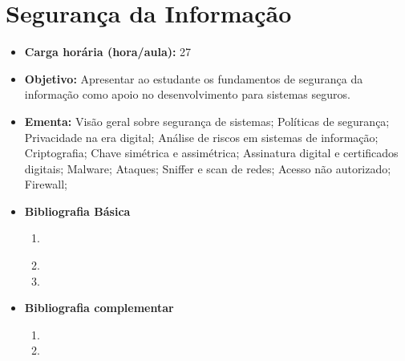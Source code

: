 \documentclass[11pt,fleqn]{book} %
\begin{document}
\section{Segurança da Informação}\label{6_seginfo}
\begin{itemize}
	\item \textbf{Carga horária (hora/aula):} 27
	\item \textbf{Objetivo:} Apresentar ao estudante os fundamentos de segurança da informação como apoio no desenvolvimento para sistemas seguros.
	\item \textbf{Ementa:} 
	Visão geral sobre segurança de sistemas;
	Políticas de segurança; 
	Privacidade na era digital;
	Análise de riscos em sistemas de informação;
	Criptografia; 
	Chave simétrica e assimétrica;
	Assinatura digital e certificados digitais; 
	Malware;
	Ataques;
	Sniffer e scan de redes;
	Acesso não autorizado;
	Firewall;
	\item \textbf{Bibliografia Básica}
	\begin{enumerate}
		\item \cite{cartilha2012}
		\item 
		\item 
	\end{enumerate}
	\item \textbf{Bibliografia complementar}
	\begin{enumerate}
		\item 
		\item
	\end{enumerate} 	
\end{itemize}


\newpage
\end{document}
